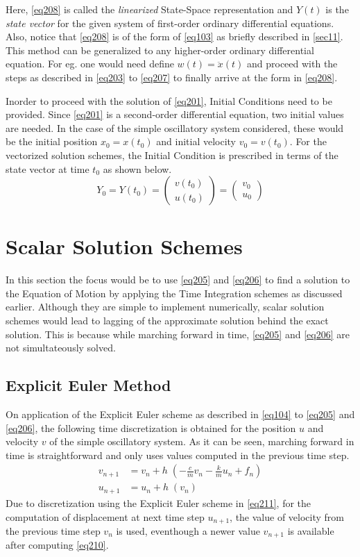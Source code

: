 Here, \cref{eq208} is called the \emph{linearized} State-Space representation and $\mathit{Y}(t)$ is the \emph{state vector} for the given system of first-order ordinary differential equations. Also, notice that \cref{eq208} is of the form of \cref{eq103} as briefly described in \cref{sec11}. This method can be generalized to any higher-order ordinary differential equation. For eg. one would need define $w(t) = \ddot{x}(t)$ and proceed with the steps as described in \cref{eq203} to \cref{eq207} to finally arrive at the form in \cref{eq208}.

Inorder to proceed with the solution of \cref{eq201}, Initial Conditions need to be provided. Since \cref{eq201} is a second-order differential equation, two initial values are needed. In the case of the simple oscillatory system considered, these would be the initial position $x_0 = x(t_0)$ and initial velocity $v_0 = v(t_0)$. For the vectorized solution schemes, the Initial Condition is prescribed in terms of the state vector at time $t_0$ as shown below.
\begin{equation}\label{eq209}
Y_{0} = Y(t_0) = \begin{pmatrix} v(t_0) \\ u(t_0) \end{pmatrix} = \begin{pmatrix} v_0 \\ u_0 \end{pmatrix}
\end{equation}
\section{Scalar Solution Schemes}
In this section the focus would be to use \cref{eq205} and \cref{eq206} to find a solution to the Equation of Motion by applying the Time Integration schemes as discussed earlier. Although they are simple to implement numerically, scalar solution schemes would lead to lagging of the approximate solution behind the exact solution. This is because while marching forward in time, \cref{eq205} and \cref{eq206} are not simultateously solved.
\subsection{Explicit Euler Method}
On application of the Explicit Euler scheme as described in \cref{eq104} to \cref{eq205} and \cref{eq206}, the following time discretization is obtained for the position $u$ and velocity $v$ of the simple oscillatory system. As it can be seen, marching forward in time is straightforward and only uses values computed in the previous time step. 
\begin{align}
v_{n+1} &= v_{n} + h \; (-\frac{c}{m} v_{n} - \frac{k}{m} u_{n} + f_{n})\label{eq210}\\
u_{n+1} &= u_{n} + h \; (v_{n})\label{eq211}
\end{align}
Due to discretization using the Explicit Euler scheme in \cref{eq211}, for the computation of displacement at next time step $u_{n+1}$, the value of velocity from the previous time step $v_{n}$ is used, eventhough a newer value $v_{n+1}$ is available after computing \cref{eq210}.

